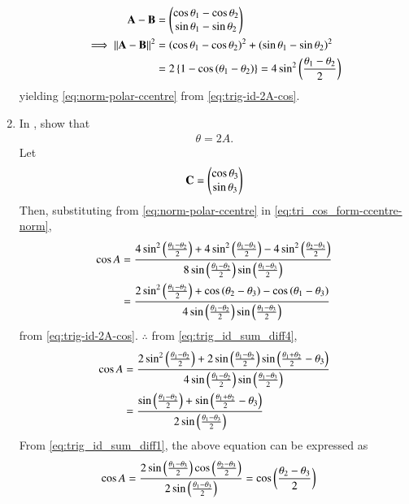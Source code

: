 \begin{enumerate}[label=\thesection.\arabic*.,ref=\thesection.\theenumi]
\begin{align}
	  \mathbf{A}-\mathbf{B} &= 
\begin{pmatrix}\cos \theta_1-\cos \theta_2 \\ \sin \theta_1-\sin \theta_2\end{pmatrix}
\\
\implies 
	  \left\lVert\mathbf{A}-\mathbf{B}\right\rVert^2 &= 
	  \left(\cos \theta_1-\cos \theta_2\right)^2 +\left(\sin \theta_1-\sin \theta_2\right)^2
	  \\
	  &= 2\left\{1-
	  \cos \left(\theta_1-\theta_2\right)\right\} = 4 \sin^2 \left(\frac{\theta_1-\theta_2}{2}\right)
  \end{align}
  yielding 
\eqref{eq:norm-polar-ccentre} from
\eqref{eq:trig-id-2A-cos}.
  \item In 
	,
show that 
  \begin{align}
	  \theta = 2A
\label{eq:ang-subtend-ccentre}.
  \end{align}
  \solution Let 
  \begin{align}
	  \mathbf{C} = \begin{pmatrix}\cos \theta_3 \\ \sin \theta_3\end{pmatrix}
  \end{align}
  Then, 
  substituting 
  from 
\eqref{eq:norm-polar-ccentre}
in 
\eqref{eq:tri_cos_form-ccentre-norm},
  \begin{align}
	  \cos A &= \frac{4 \sin^2 \left(\frac{\theta_1-\theta_2}{2}\right) +4\sin^2 \left(\frac{\theta_1-\theta_3}{2}\right)-4 \sin^2 \left(\frac{\theta_2-\theta_3}{2}\right)}{8 \sin \left(\frac{\theta_1-\theta_2}{2}\right) \sin \left(\frac{\theta_1-\theta_3}{2}\right)}
	  \\
	   &= \frac{2 \sin^2 \left(\frac{\theta_1-\theta_2}{2}\right) +\cos \left({\theta_2-\theta_3}\right)- \cos \left({\theta_1-\theta_3}\right)}{4 \sin \left(\frac{\theta_1-\theta_2}{2}\right) \sin \left(\frac{\theta_1-\theta_3}{2}\right)}
  \end{align}
  from 
\eqref{eq:trig-id-2A-cos}. $\therefore$ from 
\eqref{eq:trig_id_sum_diff4},
  \begin{align}
	   \cos A &= \frac{2 \sin^2 \left(\frac{\theta_1-\theta_2}{2}\right) +2\sin \left(\frac{\theta_1-\theta_2}{2}\right)\sin \left(\frac{\theta_1+\theta_2}{2}-\theta_3\right)}{4 \sin \left(\frac{\theta_1-\theta_2}{2}\right) \sin \left(\frac{\theta_1-\theta_3}{2}\right)}
	  \\
	   &= \frac{ \sin \left(\frac{\theta_1-\theta_2}{2}\right) +\sin \left(\frac{\theta_1+\theta_2}{2}-\theta_3\right)}{ 2\sin\left(\frac{\theta_1-\theta_3}{2}\right)}
  \end{align}
  From 
\eqref{eq:trig_id_sum_diff1}, the above equation can be expressed as
  \begin{align}
\cos A	   &= \frac{ 2\sin \brak{\frac{\theta_1-\theta_3}{2}} \cos\brak{\frac{\theta_2-\theta_3}{2}}}{ 2\sin\brak{\frac{\theta_1-\theta_3}{2}}} = \cos\brak{\frac{\theta_2-\theta_3}{2}}

\end{align}
\end{enumerate}
